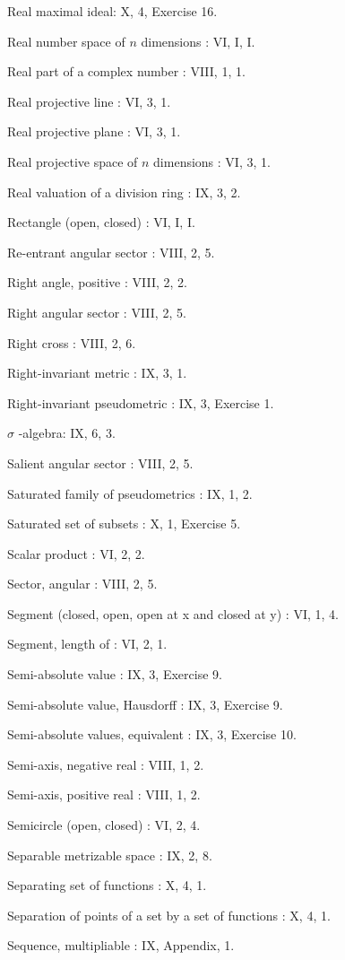 Real maximal ideal: X, 4, Exercise 16.

Real number space of \(n\) dimensions : VI, I, I.

Real part of a complex number : VIII, 1, 1.

Real projective line : VI, 3, 1.

Real projective plane : VI, 3, 1.

Real projective space of \(n\) dimensions : VI, 3, 1.

Real valuation of a division ring : IX, 3, 2.

Rectangle (open, closed) : VI, I, I.

Re-entrant angular sector : VIII, 2, 5.

Right angle, positive : VIII, 2, 2.

Right angular sector : VIII, 2, 5.

Right cross : VIII, 2, 6.

Right-invariant metric : IX, 3, 1.

Right-invariant pseudometric : IX, 3, Exercise 1.

\(\sigma\) -algebra: IX, 6, 3.

Salient angular sector : VIII, 2, 5.

Saturated family of pseudometrics : IX, 1, 2.

Saturated set of subsets : X, 1, Exercise 5.

Scalar product : VI, 2, 2.

Sector, angular : VIII, 2, 5.

Segment (closed, open, open at x and closed at y) : VI, 1, 4.

Segment, length of : VI, 2, 1.

Semi-absolute value : IX, 3, Exercise 9.

Semi-absolute value, Hausdorff : IX, 3, Exercise 9.

Semi-absolute values, equivalent : IX, 3, Exercise 10.

Semi-axis, negative real : VIII, 1, 2.

Semi-axis, positive real : VIII, 1, 2.

Semicircle (open, closed) : VI, 2, 4.

Separable metrizable space : IX, 2, 8.

Separating set of functions : X, 4, 1.

Separation of points of a set by a set of functions : X, 4, 1.

Sequence, multipliable : IX, Appendix, 1.

